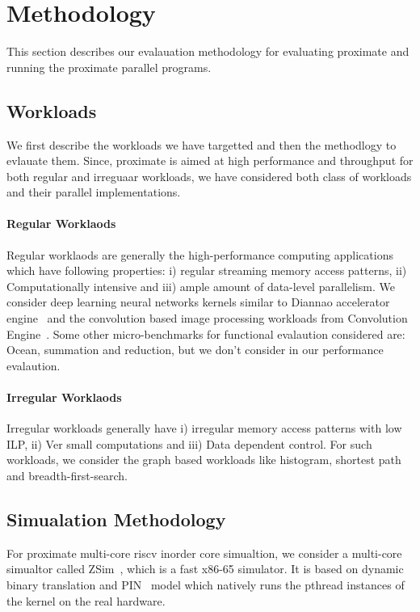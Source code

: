 \section{Methodology} \label{sec:meth}

This section describes our evalauation methodology for evaluating proximate and running the
proximate parallel programs.

\subsection{Workloads}
We first describe the workloads we have targetted and then the methodlogy to 
evlauate them. Since, proximate is aimed at high performance and throughput
for both regular and irreguaar workloads, we have considered both class of workloads
and their parallel implementations. 

\paragraph{Regular Worklaods}
Regular worklaods are generally the high-performance computing applications
which have following properties: i) regular streaming memory access patterns,
ii) Computationally intensive and iii) ample amount of data-level parallelism.
We consider deep learning neural networks kernels similar to Diannao accelerator engine~\cite{diannao}
and the convolution based image processing workloads from Convolution Engine~\cite{convolution_engine}.
Some other micro-benchmarks for functional evalaution considered are: Ocean, summation and reduction, 
but we don't consider in our performance evalaution. 


\paragraph{Irregular Worklaods}
Irregular workloads generally have i) irregular memory access patterns
with low ILP, ii) Ver small computations and iii) Data dependent control. 
For such workloads, we consider the graph based workloads like histogram, 
shortest path and breadth-first-search. 


\subsection{Simualation Methodology} 
For proximate multi-core riscv inorder core simualtion, 
we consider a multi-core simualtor called ZSim~\cite{sanchez2013zsim}, which is a
fast x86-65 simulator. It is based on dynamic binary translation and PIN~\cite{pin} model which natively 
runs the pthread instances of the kernel on the real hardware.  


